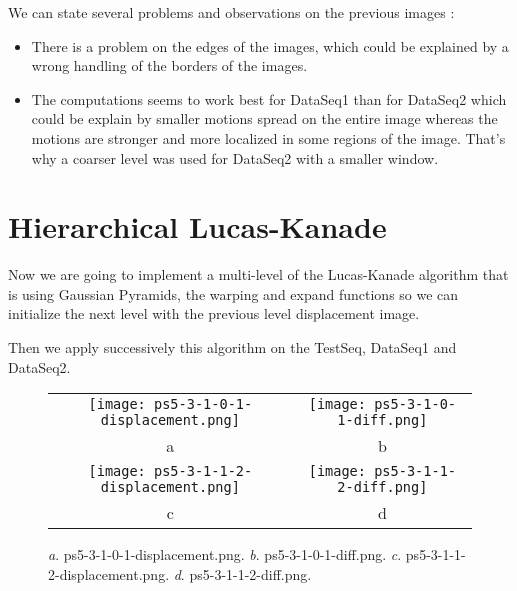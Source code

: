 \documentclass[a4paper,11pt]{article}
\begin{document}
We can state several problems and observations on the previous images : 
\begin{itemize}
\item There is a problem on the edges of the images, which could be explained by a wrong handling of the borders of the images.
\item The computations seems to work best for DataSeq1 than for DataSeq2 which could be explain by smaller motions spread on the entire image whereas the motions are stronger and more localized in some regions of the image. That's why a coarser level was used for DataSeq2 with a smaller window.
\end{itemize}

\section{Hierarchical Lucas-Kanade}

Now we are going to implement a multi-level of the Lucas-Kanade algorithm that is using Gaussian Pyramids, the warping and expand functions so we can initialize the next level with the previous level displacement image.

\lstset{style=mystyle}


Then we apply successively this algorithm on the TestSeq, DataSeq1 and DataSeq2.



\begin{figure}[H]
\begin{center}
\begin{tabular}{cc}
	\texttt{[image: ps5-3-1-0-1-displacement.png]}&
	\texttt{[image: ps5-3-1-0-1-diff.png]}\\
	a&b\\
	\texttt{[image: ps5-3-1-1-2-displacement.png]}&
	\texttt{[image: ps5-3-1-1-2-diff.png]}\\
	c&d
\end{tabular}
\end{center}
\caption{ 
\textit{a}. ps5-3-1-0-1-displacement.png.  \textit{b}. ps5-3-1-0-1-diff.png. \textit{c}. ps5-3-1-1-2-displacement.png.  \textit{d}. ps5-3-1-1-2-diff.png. }
\label{ps-5-6-a}
\end{figure}
\end{document}

